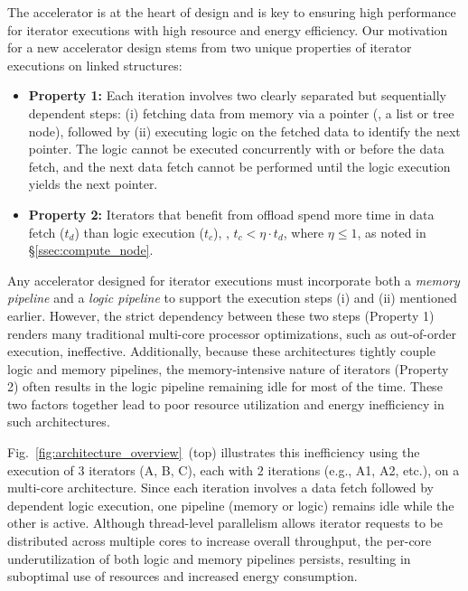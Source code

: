 The accelerator is at the heart of \pulse design and is key to ensuring high performance for iterator executions with high resource and energy efficiency. Our motivation for a new accelerator design stems from two unique properties of iterator executions on linked structures: 



\begin{itemize}[leftmargin=*, itemsep=0pt]
  \item \textbf{Property 1:} Each iteration involves two clearly separated but sequentially dependent steps: (i) fetching data from memory via a pointer (\eg, a list or tree node), followed by (ii) executing logic on the fetched data to identify the next pointer. The logic cannot be executed concurrently with or before the data fetch, and the next data fetch cannot be performed until the logic execution yields the next pointer.
 
  \item \textbf{Property 2:} Iterators that benefit from offload spend more time in data fetch ($t_d$) than logic execution ($t_c$), \ie, $t_c < \eta \cdot t_d$, where $\eta \leq 1$, as noted in \S\ref{ssec:compute_node}. 
\end{itemize}

Any accelerator designed for iterator executions must incorporate both a \emph{memory pipeline} and a \emph{logic pipeline} to support the execution steps (i) and (ii) mentioned earlier. However, the strict dependency between these two steps (Property 1) renders many traditional multi-core processor optimizations, such as out-of-order execution, ineffective. Additionally, because these architectures tightly couple logic and memory pipelines, the memory-intensive nature of iterators (Property 2) often results in the logic pipeline remaining idle for most of the time. These two factors together lead to poor resource utilization and energy inefficiency in such architectures.

Fig.~\ref{fig:architecture_overview}~(top) illustrates this inefficiency using the execution of 3 iterators (A, B, C), each with $2$ iterations (e.g., A1, A2, etc.), on a multi-core architecture. Since each iteration involves a data fetch followed by dependent logic execution, one pipeline (memory or logic) remains idle while the other is active. Although thread-level parallelism allows iterator requests to be distributed across multiple cores to increase overall throughput, the per-core underutilization of both logic and memory pipelines persists, resulting in suboptimal use of resources and increased energy consumption.



